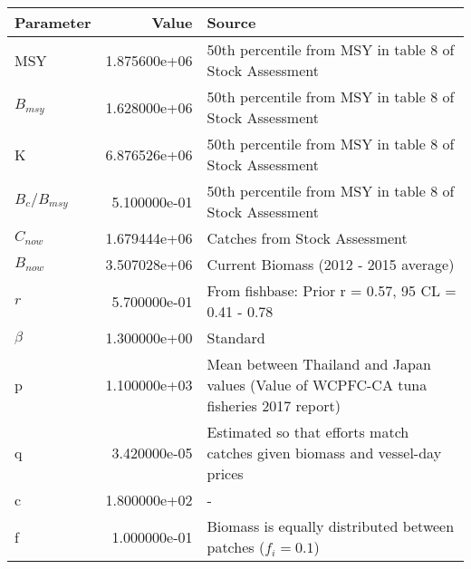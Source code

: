
\begin{tabular}{l|r|l}
\hline
Parameter & Value & Source\\
\hline
MSY & 1.875600e+06 & 50th percentile from MSY in table 8 of Stock Assessment\\
\hline
$B_{msy}$ & 1.628000e+06 & 50th percentile from MSY in table 8 of Stock Assessment\\
\hline
K & 6.876526e+06 & 50th percentile from MSY in table 8 of Stock Assessment\\
\hline
$B_c/B_{msy}$ & 5.100000e-01 & 50th percentile from MSY in table 8 of Stock Assessment\\
\hline
$C_{now}$ & 1.679444e+06 & Catches from Stock Assessment\\
\hline
$B_{now}$ & 3.507028e+06 & Current Biomass (2012 - 2015 average)\\
\hline
$r$ & 5.700000e-01 & From fishbase: Prior r = 0.57, 95 CL = 0.41 - 0.78\\
\hline
$\beta$ & 1.300000e+00 & Standard\\
\hline
p & 1.100000e+03 & Mean between Thailand and Japan values (Value of WCPFC-CA tuna fisheries 2017 report)\\
\hline
q & 3.420000e-05 & Estimated so that efforts match catches given biomass and vessel-day prices\\
\hline
c & 1.800000e+02 & -\\
\hline
f & 1.000000e-01 & Biomass is equally distributed between patches ($f_i = 0.1$)\\
\hline
\end{tabular}